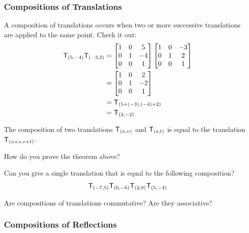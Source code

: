 \subsubsection{Compositions of Translations}

A composition of translations occurs when two or more successive
translations are applied to the same point. Check it out:
\begin{align*}
\mathsf{T}_{(5,-4)}\mathsf{T}_{(-3,2)} &= \begin{bmatrix}
1 & 0 &  5\\
0 & 1 & -4\\
0 & 0 &  1
\end{bmatrix}
\begin{bmatrix}
1 & 0 & -3\\
0 & 1 &  2\\
0 & 0 &  1
\end{bmatrix}\\
&=\begin{bmatrix}
1 & 0 &  2\\
0 & 1 & -2\\
0 & 0 &  1
\end{bmatrix}\\
&=\mathsf{T}_{(5+(-3),(-4)+2)}\\
&=\mathsf{T}_{(2,-2)}
\end{align*}

\begin{thm}
The composition of two translations $\mathsf{T}_{(u,v)}$ and
$\mathsf{T}_{(s,t)}$ is equal to the translation $\mathsf{T}_{(u+s,v+t)}$.
\end{thm}

\begin{ques} How do you prove the theorem above?
\end{ques}
\QM

\begin{ques}
Can you give a single translation that is equal to the following composition?
\[
\mathsf{T}_{(-7,5)}\mathsf{T}_{(0,-6)}\mathsf{T}_{(2,8)}\mathsf{T}_{(5,-4)}
\]
\end{ques}
\QM

\begin{ques}
Are compositions of translations commutative?  Are they
associative?
\end{ques}
\QM


\subsubsection{Compositions of Reflections}

